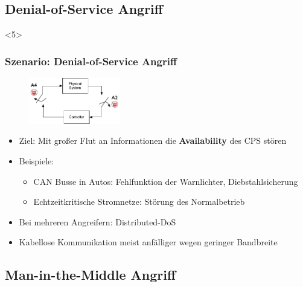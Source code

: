 \documentclass{sikslides}
\begin{document}
    \subsection{Denial-of-Service Angriff}
    \begin{frame}
        <5>
        \frametitle{Szenario: Denial-of-Service Angriff}
        \begin{figure}
            \centering
            \includegraphics[width=4cm]{figure/dos}
        \end{figure}
        \begin{itemize}
            \item Ziel: Mit großer Flut an Informationen die \textbf{Availability} des CPS stören
            \item Beispiele:
            \begin{itemize}
                \item CAN Busse in Autos: Fehlfunktion der Warnlichter, Diebstahlsicherung
                \item Echtzeitkritische Stromnetze: Störung des Normalbetrieb
            \end{itemize}
            \item Bei mehreren Angreifern: Distributed-DoS
            \item Kabellose Kommunikation meist anfälliger wegen geringer Bandbreite
        \end{itemize}
    \end{frame}

    \subsection{Man-in-the-Middle Angriff}
\end{document}
